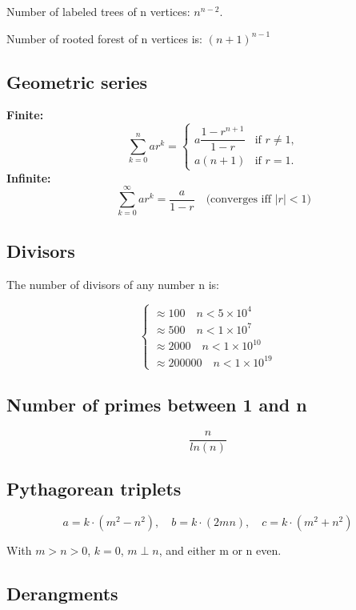 \documentclass[10pt]{article}
\begin{document}
\begin{multicols*}{2}
Number of labeled trees of n vertices: $n^{n-2}$.

Number of rooted forest of n vertices is: $(n+1)^{n-1}$

\subsection{Geometric series}

\textbf{Finite:} \[\quad \sum_{k=0}^{n} ar^k = 
\begin{cases} 
a \dfrac{1 - r^{n+1}}{1 - r} & \text{if } r \neq 1, \\
a(n + 1) & \text{if } r = 1.
\end{cases}
\]
\textbf{Infinite:} \[\quad \sum_{k=0}^{\infty} ar^k = \frac{a}{1 - r} \quad \text{(converges iff } |r| < 1\text{)}
\]
\subsection{Divisors}

The number of divisors of any number n is:

\[
\begin{cases}
    \approx 100 \quad n< 5 \times 10^4 \\
    \approx 500 \quad n<1 \times 10^7 \\
    \approx 2000 \quad n < 1 \times 10^10 \\
    \approx 200000 \quad n < 1 \times 10^19
\end{cases}
\]

\subsection{Number of primes between 1 and n}

\[
\frac{n}{ln(n)}
\]


\subsection{Pythagorean triplets}

\[
a = k \cdot (m^2 - n^2), \quad b = k\cdot(2mn), \quad c = k\cdot(m^2+n^2)
\]

With $m>n>0$, $k=0$, $m\perp n$, and either m or n even.


\subsection{Derangments}


\end{multicols*}
\end{document}
